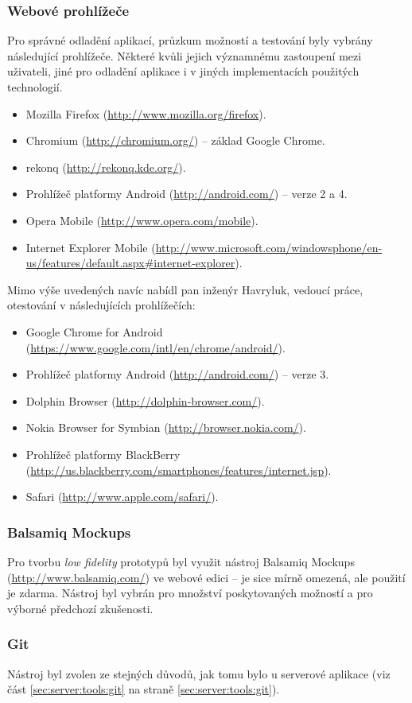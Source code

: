 \subsubsection{Webové prohlížeče}
Pro správné odladění aplikací, průzkum možností a testování byly vybrány následující prohlížeče. Některé kvůli jejich významnému zastoupení mezi uživateli, jiné pro odladění aplikace i v jiných implementacích použitých technologií.
\begin{itemize}
 \item Mozilla Firefox (\url{http://www.mozilla.org/firefox}).
 \item Chromium (\url{http://chromium.org/}) -- základ Google Chrome.
 \item rekonq (\url{http://rekonq.kde.org/}).
 \item Prohlížeč platformy Android (\url{http://android.com/}) -- verze 2 a 4.
 \item Opera Mobile (\url{http://www.opera.com/mobile}).
 \item Internet Explorer Mobile (\url{http://www.microsoft.com/windowsphone/en-us/features/default.aspx#internet-explorer}).
\end{itemize}
Mimo výše uvedených navíc nabídl pan inženýr Havryluk, vedoucí práce, otestování v následujících prohlížečích:
\begin{itemize}
 \item Google Chrome for Android (\url{https://www.google.com/intl/en/chrome/android/}).
 \item Prohlížeč platformy Android (\url{http://android.com/}) -- verze 3.
 \item Dolphin Browser (\url{http://dolphin-browser.com/}).
 \item Nokia Browser for Symbian  (\url{http://browser.nokia.com/}).
 \item Prohlížeč platformy BlackBerry (\url{http://us.blackberry.com/smartphones/features/internet.jsp}).
 \item Safari (\url{http://www.apple.com/safari/}).
\end{itemize}

\subsubsection{Balsamiq Mockups}
Pro tvorbu \textit{low fidelity} prototypů byl využit nástroj Balsamiq Mockups (\url{http://www.balsamiq.com/}) ve webové edici -- je sice mírně omezená, ale použití je zdarma. Nástroj byl vybrán pro množství poskytovaných možností a pro výborné předchozí zkušenosti.

\subsubsection{Git}
Nástroj byl zvolen ze stejných důvodů, jak tomu bylo u serverové aplikace (viz část \ref{sec:server:tools:git} na straně \ref{sec:server:tools:git}).
